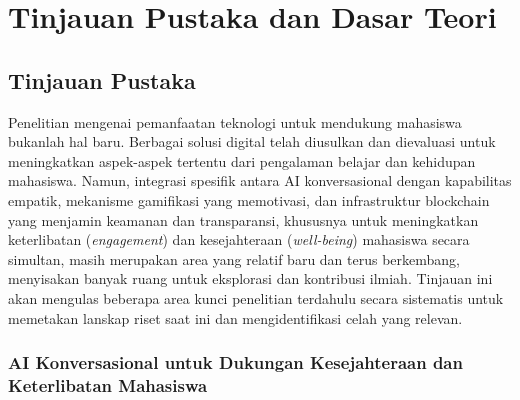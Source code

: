 \chapter{Tinjauan Pustaka dan Dasar Teori}


\section{Tinjauan Pustaka}
\label{sec:tinjauan_pustaka_revised}

Penelitian mengenai pemanfaatan teknologi untuk mendukung mahasiswa bukanlah hal baru. Berbagai solusi digital telah diusulkan dan dievaluasi untuk meningkatkan aspek-aspek tertentu dari pengalaman belajar dan kehidupan mahasiswa. Namun, integrasi spesifik antara AI konversasional dengan kapabilitas empatik, mekanisme gamifikasi yang memotivasi, dan infrastruktur blockchain yang menjamin keamanan dan transparansi, khususnya untuk meningkatkan keterlibatan (\textit{engagement}) dan kesejahteraan (\textit{well-being}) mahasiswa secara simultan, masih merupakan area yang relatif baru dan terus berkembang, menyisakan banyak ruang untuk eksplorasi dan kontribusi ilmiah. Tinjauan ini akan mengulas beberapa area kunci penelitian terdahulu secara sistematis untuk memetakan lanskap riset saat ini dan mengidentifikasi celah yang relevan.

\subsection{AI Konversasional untuk Dukungan Kesejahteraan dan Keterlibatan Mahasiswa} 
\label{subsec:ai_konversasional_tinjauan_revised}

